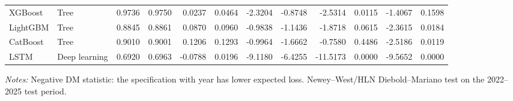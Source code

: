 \begin{table}[htbp]
{\begin{tabular}{llrrrrrrrrrr}
XGBoost & Tree & 0.9736 & 0.9750 & 0.0237 & 0.0464 & -2.3204 & -0.8748 & -2.5314 & 0.0115 & -1.4067 & 0.1598 \\
LightGBM & Tree & 0.8845 & 0.8861 & 0.0870 & 0.0960 & -0.9838 & -1.1436 & -1.8718 & 0.0615 & -2.3615 & 0.0184 \\
CatBoost & Tree & 0.9010 & 0.9001 & 0.1206 & 0.1293 & -0.9964 & -1.6662 & -0.7580 & 0.4486 & -2.5186 & 0.0119 \\
LSTM & Deep learning & 0.6920 & 0.6963 & -0.0788 & 0.0196 & -9.1180 & -6.4255 & -11.5173 & 0.0000 & -9.5652 & 0.0000 \\
\bottomrule
\end{tabular}%
}
\par\vspace{2pt}\footnotesize\textit{Notes:} Negative DM statistic: the specification with year has lower expected loss. Newey--West/HLN Diebold--Mariano test on the 2022--2025 test period.
\end{table}
